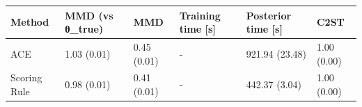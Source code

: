 \begin{tabular}{llllll}
\toprule
Method & MMD (vs θ_true) & MMD & Training time [s] & Posterior time [s] & C2ST \\
\midrule
ACE & 1.03 (0.01) & 0.45 (0.01) & - & 921.94 (23.48) & 1.00 (0.00) \\
Scoring Rule & 0.98 (0.01) & 0.41 (0.01) & - & 442.37 (3.04) & 1.00 (0.00) \\
\bottomrule
\end{tabular}
